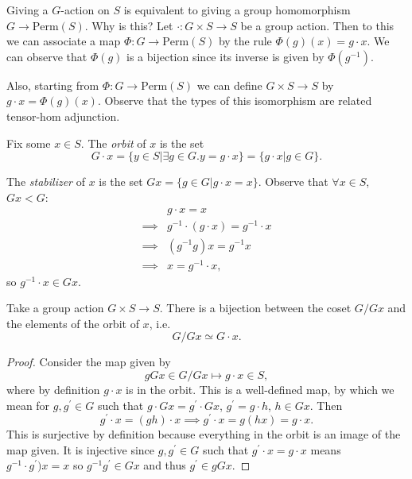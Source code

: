 \documentclass{article}
\begin{document}
\begin{remark}
Giving a $G$-action on $S$ is equivalent to giving a group
homomorphism $G \to \mathrm{Perm}(S)$. Why is this? Let
$\cdot : G \times S \to S$ be a group action. Then to this we can
associate a map $\Phi : G \to \mathrm{Perm}(S)$ by the rule
$\Phi(g)(x) = g \cdot x$. We can observe that $\Phi(g)$ is a bijection
since its inverse is given by $\Phi(g^{-1})$. 

Also, starting from $\Phi : G \to \mathrm{Perm}(S)$ we can define
$G \times S \to S$ by $g \cdot x = \Phi(g)(x)$. Observe that the types
of this isomorphism are related tensor-hom adjunction.
\end{remark}

\begin{defn}
Fix some $x \in S$. The \emph{orbit} of $x$ is the set
$$
G \cdot x = \{ y \in S | \exists g \in G . y = g \cdot x \} 
          = \{ g \cdot x | g \in G \}.
$$

The \emph{stabilizer} of $x$ is the set 
$Gx = \{ g \in G | g \cdot x = x \}$. Observe that 
$\forall x \in S$, $Gx < G$:
\begin{align*}
         & g \cdot x = x \\
\implies & g^{-1} \cdot (g \cdot x) = g^{-1} \cdot x \\
\implies & (g^{-1} g) x = g^{-1} x \\
\implies & x = g^{-1} \cdot x,
\end{align*}
so $g^{-1} \cdot x \in Gx$.
\end{defn}

\begin{prop}
Take a group action $G \times S \to S$. There is a bijection between
the coset $G / Gx$ and the elements of the orbit of $x$, i.e.
$$
G / Gx \simeq G \cdot x.
$$
\end{prop}
\begin{proof}
Consider the map given by
$$
gGx \in G / Gx \mapsto g \cdot x \in S,
$$
where by definition $g \cdot x$ is in the orbit. This is a
well-defined map, by which we mean for $g, g^\prime \in G$ such that
$g \cdot Gx = g^\prime \cdot Gx$, $g^\prime = g \cdot h$, $h \in
Gx$. Then 
$$
g^\prime \cdot x = (g h) \cdot x 
\implies g^\prime \cdot x = g(hx) = g \cdot x.
$$
This is surjective by definition because everything in the orbit is an
image of the map given. It is injective since $g, g^\prime \in G$ such
that $g^\prime \cdot x = g \cdot x$ means $g^{-1} \cdot g^\prime) x =
x$ so $g^{-1} g^\prime \in G x$ and thus $g^\prime \in g G x$.
\end{proof}
\end{document}
